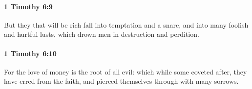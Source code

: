 		\paragraph{1 Timothy 6:9} %
			\label{1TIMOTHY-6-9}

			But they that will be rich fall into temptation and a snare, and into many foolish and hurtful lusts, which drown men in destruction and perdition.

			\begin{framed}
			\scriptsize
				\begin{compactdesc}
					\item[SBLG] 
				\end{compactdesc}
			\end{framed}

		\paragraph{1 Timothy 6:10} %
			\label{1TIMOTHY-6-10}

			For the love of money is the root of all evil: which while some coveted after, they have erred from the faith, and pierced themselves through with many sorrows.

